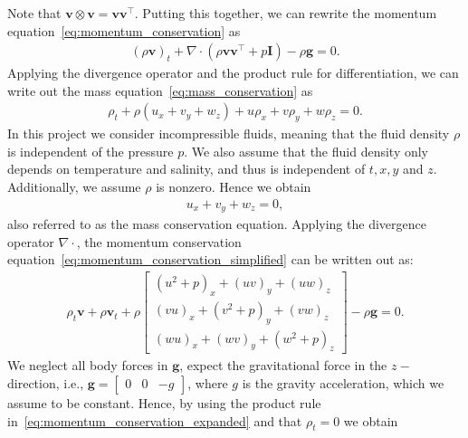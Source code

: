 Note that $\mathbf{v} \otimes \mathbf{v} = \mathbf{v} \mathbf{v}^\top$.
Putting this together, we can rewrite the momentum equation~\eqref{eq:momentum_conservation} as
\begin{align}\label{eq:momentum_conservation_simplified}
    {(\rho \mathbf{v})}_t + \nabla \cdot (\rho \mathbf{v} \mathbf{v}^\top  + p \mathbf{I}) - \rho \mathbf{g} = 0.
\end{align}
Applying the divergence operator and the product rule for differentiation, we can write out the mass equation~\eqref{eq:mass_conservation} as
\begin{align*}
    \rho_t + \rho(u_x + v_y + w_z) + u \rho_x + v \rho_y + w \rho_z = 0.
\end{align*}
In this project we consider incompressible fluids, meaning that the fluid density $\rho$ is independent of the pressure $p$.
We also assume that the fluid density only depends on temperature and salinity, and thus is independent of $t, x, y$ and $z$.
Additionally, we assume $\rho$ is nonzero.
Hence we obtain
\begin{align}
    u_x + v_y + w_z = 0, \label{eq:mass_conservation_incompressible}
\end{align}
also referred to as the mass conservation equation.
Applying the divergence operator $\nabla \cdot$, the momentum conservation equation~\eqref{eq:momentum_conservation_simplified} can be written out as:
\begin{align}\label{eq:momentum_conservation_expanded}
    \rho_t \mathbf{v} + \rho \mathbf{v}_t + \rho \begin{bmatrix}
        {(u^2 + p)}_x + {(uv)}_y + {(uw)}_z \\
        {(vu)}_x + {(v^2 + p)}_y + {(vw)}_z \\
        {(wu)}_x + {(wv)}_y + {(w^2 + p)}_z 
    \end{bmatrix}
    - \rho \mathbf{g} = 0.
\end{align}
We neglect all body forces in $\mathbf{g}$, expect the gravitational force in the $z-$direction, i.e., $\mathbf{g} = \begin{bmatrix} 0 & 0 & -g \end{bmatrix}$, where $g$ is the gravity acceleration, which we assume to be constant.
Hence, by using the product rule in~\eqref{eq:momentum_conservation_expanded} and that $\rho_t = 0$ we obtain
